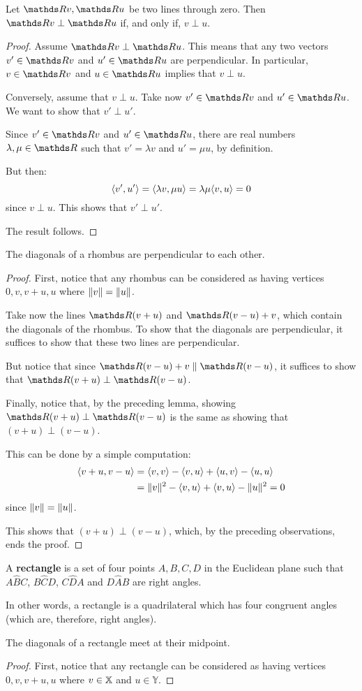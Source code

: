 \begin{lemma}
	Let $\R v,\R u$ be two lines through zero. Then $\R v\perp \R u$ if, and only if, $v\perp u$.
\end{lemma}
\begin{proof}
	Assume $\R v\perp \R u$. This means that any two vectors $v'\in \R v$ and $u'\in \R u$ are perpendicular. In particular, $v\in \R v$ and $u\in \R u$ implies that $v\perp u$.
	
	\bigskip
	Conversely, assume that $v\perp u$. Take now $v'\in \R v$ and $u'\in \R u$. We want to show that $v'\perp u'$.
	
	Since $v'\in \R v$ and $u'\in \R u$, there are real numbers $\lambda,\mu\in \R$ such that $v'=\lambda v$ and $u'=\mu u$, by definition.
	
	But then:
	\[\langle v',u'\rangle=\langle \lambda v,\mu u\rangle=\lambda\mu\langle v,u\rangle=0\] since $v\perp u$. This shows that $v'\perp u'$.
	
	The result follows.
\end{proof}
\begin{cor}
	The diagonals of a rhombus are perpendicular to each other.
\end{cor}
\begin{proof}
	First, notice that any rhombus can be considered as having vertices $0,v,v+u,u$ where $\lVert v\rVert=\lVert u\rVert$.
	
	Take now the lines $\R(v+u)$ and $\R(v-u)+v$, which contain the diagonals of the rhombus. To show that the diagonals are perpendicular, it suffices to show that these two lines are perpendicular.
	
	But notice that since $\R(v-u)+v\parallel\R(v-u)$, it suffices to show that $\R(v+u)\perp\R(v-u)$.
	
	Finally, notice that, by the preceding lemma, showing $\R(v+u)\perp\R(v-u)$ is the same as showing that $(v+u)\perp (v-u)$.
	
	This can be done by a simple computation:
	\begin{align*}
		\langle v+u,v-u\rangle&=\langle v,v\rangle-\langle v,u\rangle+\langle u,v\rangle-\langle u,u\rangle\\
		&=\lVert v\rVert^2-\langle v,u\rangle+\langle v,u\rangle-\lVert u\rVert^2=0
	\end{align*}since $\lVert v\rVert=\lVert u\rVert$.
	
	This shows that $(v+u)\perp(v-u)$, which, by the preceding observations, ends the proof.
\end{proof}

\begin{df}
	A \textbf{rectangle} is a set of four points $A,B,C,D$ in the Euclidean plane such that $A\hat{B}C$, $B\hat{C}D$, $C\hat{D}A$ and $D\hat{A}B$ are right angles.
	
	In other words, a rectangle is a quadrilateral which has four congruent angles (which are, therefore, right angles).
\end{df}

\begin{prop}
	The diagonals of a rectangle meet at their midpoint.
\end{prop}
\begin{proof}
	First, notice that any rectangle can be considered as having vertices $0,v,v+u,u$ where $v\in\mathbb X$ and $u\in\mathds{Y}$.
\end{proof}